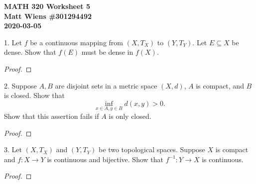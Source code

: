 \documentclass{article}
\begin{document}
\textbf{MATH 320 Worksheet 5} \\
\textbf{Matt Wiens \#301294492} \\
\textbf{2020-03-05}

1. Let $f$ be a continuous mapping from $(X, T_X)$ to $(Y, T_Y)$. Let $E
   \subseteq X$ be dense. Show that $f(E)$ must be dense in $f(X)$.

\begin{proof}

\end{proof}

\newpage

2. Suppose $A, B$ are disjoint sets in a metric space $(X, d)$, $A$ is
   compact, and $B$ is closed. Show that
%
\begin{equation*}
    \inf_{x \in A, y \in B} d(x, y) > 0
    .
\end{equation*}
%
Show that this assertion fails if $A$ is only closed.

\begin{proof}

\end{proof}

\newpage

3. Let $(X, T_X)$ and $(Y, T_Y)$ be two topological spaces. Suppose $X$
   is compact and $f: X \to Y$ is continuous and bijective. Show that
   $f^{-1}: Y \to X$ is continuous.

\begin{proof}

\end{proof}
\end{document}
